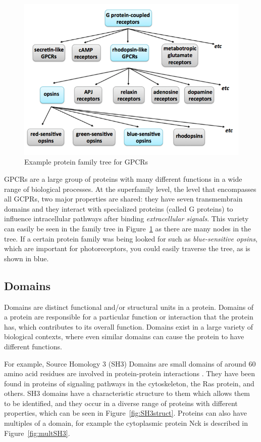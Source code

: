 \documentclass{article}
\begin{document}
\begin{figure}[!h]
\centering
\includegraphics[width=.5\textwidth]{family2.png}
\caption{Example protein family tree for GPCRs \cite{EBI}}
\label{fig:family2}
\end{figure}

GPCRs are a large group of proteins with many different functions in a wide range of biological processes. At the superfamily level, the level that encompasses all GCPRs, two major properties are shared: they have seven transmembrain domains and they interact with specialized proteins (called G proteins) to influence intracellular pathways after binding {\em extracellular signals}. This variety can easily be seen in the family tree in Figure~\ref{fig:family2} as there are many nodes in the tree. If a certain protein family was being looked for such as {\em blue-sensitive opsins}, which are important for photoreceptors, you could easily traverse the tree, as is shown in blue.
\newpage

\subsection*{Domains}

Domains are distinct functional and/or structural units in a protein. Domains of a protein are responsible for a particular function or interaction that the protein has, which contributes to its overall function. Domains exist in a large variety of biological contexts, where even similar domains can cause the protein to have different functions.

For example, Source Homology 3 (SH3) Domains are small domains of around 60 amino acid residues are involved in protein-protein interactions \cite{SH3}. They have been found in proteins of signaling pathways in the cytoskeleton, the Ras protein, and others. SH3 domains have a characteristic structure to them which allows them to be identified, and they occur in a diverse range of proteins with different properties, which can be seen in Figure~\ref{fig:SH3struct}. Proteins can also have multiples of a domain, for example the cytoplasmic protein Nck is described in Figure~\ref{fig:multSH3}.
\end{document}
